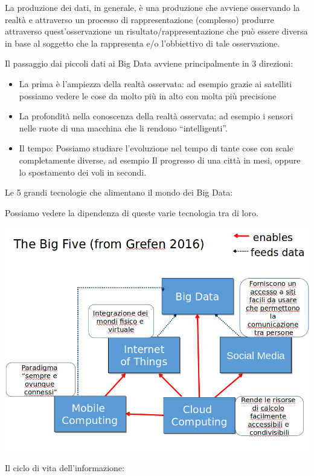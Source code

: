 \documentclass[a4page, 11pt]{article}
\begin{document}
La produzione dei dati, in generale, è una produzione che avviene
osservando la realtà e attraverso un processo di rappresentazione
(complesso) produrre attraverso quest'osservazione un
risultato/rappresentazione che può essere diversa in base al soggetto
che la rappresenta e/o l'obbiettivo di tale osservazione.

Il passaggio dai piccoli dati ai Big Data avviene principalmente in 3
direzioni:

\begin{itemize}
	 
	\item
	La prima è l'ampiezza della realtà osservata: ad esempio grazie ai
	satelliti possiamo vedere le cose da molto più in alto con molta più
	precisione
	\item
	La profondità nella conoscenza della realtà osservata: ad esempio i
	sensori nelle ruote di una macchina che li rendono ``intelligenti''.
	\item
	Il tempo: Possiamo studiare l'evoluzione nel tempo di tante cose con
	scale completamente diverse, ad esempio Il progresso di una città in
	mesi, oppure lo spostamento dei voli in secondi.
\end{itemize}

Le 5 grandi tecnologie che alimentano il mondo dei Big Data:

Possiamo vedere la dipendenza di queste varie tecnologia tra di loro.
\begin{center}
	\includegraphics[scale=0.4]{image7.png}
\end{center}

Il ciclo di vita dell'informazione:
\end{document}
